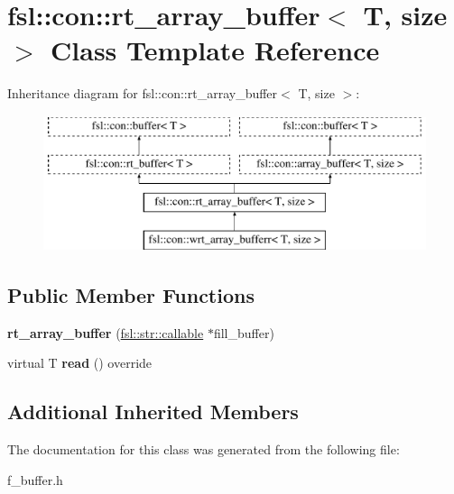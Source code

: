 \hypertarget{classfsl_1_1con_1_1rt__array__buffer}{}\section{fsl\+::con\+::rt\+\_\+array\+\_\+buffer$<$ T, size $>$ Class Template Reference}
\label{classfsl_1_1con_1_1rt__array__buffer}
Inheritance diagram for fsl\+::con\+::rt\+\_\+array\+\_\+buffer$<$ T, size $>$\+:\begin{figure}[H]
\begin{center}
\leavevmode
\includegraphics[height=4.000000cm]{classfsl_1_1con_1_1rt__array__buffer}
\end{center}
\end{figure}
\subsection*{Public Member Functions}
\begin{DoxyCompactItemize}
\item 
\mbox{\label{classfsl_1_1con_1_1rt__array__buffer_a1ee57c1796331087ed718b73a6927aca}} 
{\bfseries rt\+\_\+array\+\_\+buffer} (\mbox{\hyperlink{classfsl_1_1str_1_1callable}{fsl\+::str\+::callable}} $\ast$fill\+\_\+buffer)
\item 
\mbox{\label{classfsl_1_1con_1_1rt__array__buffer_addf4c3ae7b7afe6beaa34346fcf6a740}} 
virtual T {\bfseries read} () override
\end{DoxyCompactItemize}
\subsection*{Additional Inherited Members}


The documentation for this class was generated from the following file\+:\begin{DoxyCompactItemize}
\item 
f\+\_\+buffer.\+h\end{DoxyCompactItemize}
